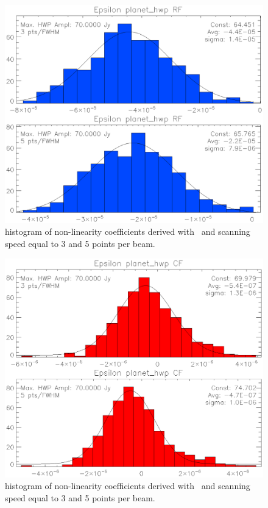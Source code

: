 \begin{figure}
	\includegraphics[clip, angle=0, width=\columnwidth]{Figures/histos_epsilon_rf.eps}
	\caption{histogram of non-linearity coefficients derived with \methodu\ and scanning speed equal to 3 and 5 points per beam.}
	\label{fig:histos_epsilon_rf}
\end{figure}

\begin{figure}
	\includegraphics[clip, angle=0, width=\columnwidth]{Figures/histos_epsilon_cf.eps}
	\caption{histogram of non-linearity coefficients derived with \methodd\ and scanning speed equal to 3 and 5 points per beam.}
	\label{fig:histos_epsilon_cf}
\end{figure}

